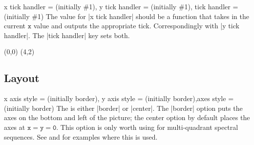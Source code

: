 \begin{sseqdata}[|| name = ex1, cohomological Serre grading]
\begin{keylist}{x tick handler =  (initially \#1), y tick handler =  (initially \#1), tick handler =  (initially \#1)}
The value for |x tick handler| should be a function that takes in the current $\mathtt{x}$ value and outputs the appropriate tick. Correspondingly with |y tick handler|. The |tick handler| key sets both.
\begin{codeexample}[width = 7cm]
\begin{sseqpage}[ x range = {0}{4}, yscale = 1.78,
    x tick handler = {
        \ifnum#1 = 0\relax
            0
        \else
            \ifnum#1 = 1\relax
                \protect\vphantom{2}n
            \else
                #1n
            \fi
        \fi
    }
]
\class(0,0)
\class(4,2)
\end{sseqpage}
\end{codeexample}
\end{keylist}

\subsection{Layout}
\begin{keylist}{x axis style =  (initially border), y axis style =  (initially border),axes style =  (initially border)}
The  is either |border| or |center|. The |border| option puts the axes on the bottom and left of the picture; the center option by default places the axes at $\mathtt{x = y = 0}$. This option is only worth using for multi-quadrant spectral sequences. See  and  for examples where this is used.
\end{keylist}


\end{sseqdata}
